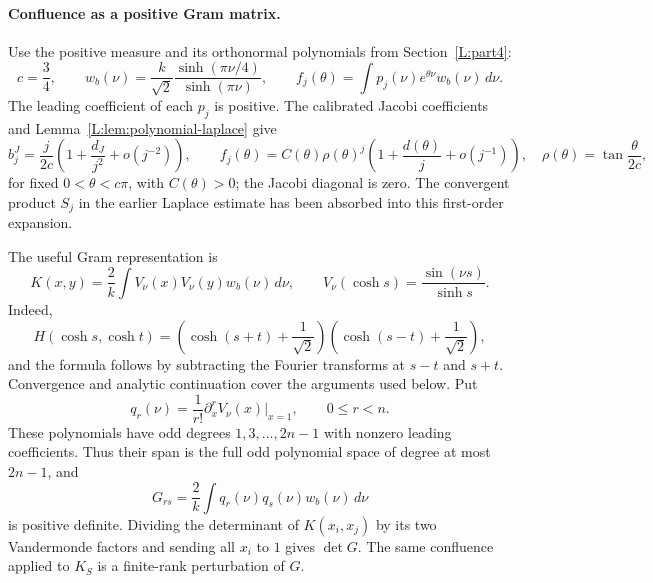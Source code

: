 \documentclass[11pt]{article}
\numberwithin{equation}{section}
\theoremstyle{definition}\newtheorem{definition}[theorem]{Definition}
\theoremstyle{remark}\newtheorem{remark}[theorem]{Remark}
\begin{document}
\paragraph{Confluence as a positive Gram matrix.}
Use the positive measure and its orthonormal polynomials from
Section~\ref{L:part4}:
\[
 c=\frac34,\qquad
 w_b(\nu)=\frac{k}{\sqrt2}\frac{\sinh(\pi\nu/4)}{\sinh(\pi\nu)},
 \qquad
 f_j(\theta)=\int p_j(\nu)e^{\theta\nu}w_b(\nu)\,d\nu.
\]
The leading coefficient of each $p_j$ is positive. The calibrated Jacobi coefficients and Lemma~\ref{L:lem:polynomial-laplace} give
\[
 b_j^{J}=\frac{j}{2c}
       \left(1+\frac{d_J}{j^2}+o(j^{-2})\right),
 \qquad
 f_j(\theta)=C(\theta)\rho(\theta)^j
       \left(1+\frac{d(\theta)}j+o(j^{-1})\right),
 \quad
 \rho(\theta)=\tan\frac{\theta}{2c},
\]
for fixed $0<\theta<c\pi$, with $C(\theta)>0$; the Jacobi diagonal is
zero. The convergent product $S_j$ in the earlier Laplace estimate has
been absorbed into this first-order expansion.

The useful Gram representation is
\[
 K(x,y)=\frac2k\int V_\nu(x)V_\nu(y)w_b(\nu)\,d\nu,
 \qquad
 V_\nu(\cosh s)=\frac{\sin(\nu s)}{\sinh s}.
\]
Indeed,
\[
 H(\cosh s,\cosh t)
 =\left(\cosh(s+t)+\frac1{\sqrt2}\right)
  \left(\cosh(s-t)+\frac1{\sqrt2}\right),
\]
and the formula follows by subtracting the Fourier transforms at $s-t$
and $s+t$. Convergence and analytic continuation cover the arguments
used below. Put
\[
 q_r(\nu)=\frac1{r!}\partial_x^r V_\nu(x)\big|_{x=1},
 \qquad 0\le r<n.
\]
These polynomials have odd degrees $1,3,\ldots,2n-1$ with nonzero
leading coefficients. Thus their span is the full odd polynomial space
of degree at most $2n-1$, and
\[
 G_{rs}=\frac2k\int q_r(\nu)q_s(\nu)w_b(\nu)\,d\nu
\]
is positive definite. Dividing the determinant of $K(x_i,x_j)$ by its
two Vandermonde factors and sending all $x_i$ to $1$ gives $\det G$.
The same confluence applied to $K_S$ is a finite-rank perturbation of $G$.
\end{document}

